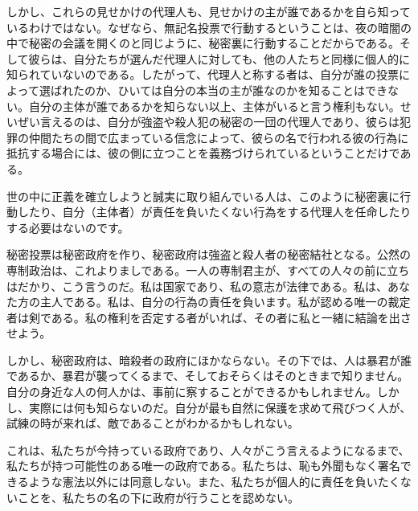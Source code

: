 \documentclass[dvipdfmx, uplatex, tate, landscape]{utbook}
\begin{document}
しかし、これらの見せかけの代理人も、見せかけの主が誰であるかを自ら知っているわけではない。なぜなら、無記名投票で行動するということは、夜の暗闇の中で秘密の会議を開くのと同じように、秘密裏に行動することだからである。そして彼らは、自分たちが選んだ代理人に対しても、他の人たちと同様に個人的に知られていないのである。したがって、代理人と称する者は、自分が誰の投票によって選ばれたのか、ひいては自分の本当の主が誰なのかを知ることはできない。自分の主体が誰であるかを知らない以上、主体がいると言う権利もない。せいぜい言えるのは、自分が強盗や殺人犯の秘密の一団の代理人であり、彼らは犯罪の仲間たちの間で広まっている信念によって、彼らの名で行われる彼の行為に抵抗する場合には、彼の側に立つことを義務づけられているということだけである。

世の中に正義を確立しようと誠実に取り組んでいる人は、このように秘密裏に行動したり、自分（主体者）が責任を負いたくない行為をする代理人を任命したりする必要はないのです。

秘密投票は秘密政府を作り、秘密政府は強盗と殺人者の秘密結社となる。公然の専制政治は、これよりましである。一人の専制君主が、すべての人々の前に立ちはだかり、こう言うのだ。私は国家であり、私の意志が法律である。私は、あなた方の主人である。私は、自分の行為の責任を負います。私が認める唯一の裁定者は剣である。私の権利を否定する者がいれば、その者に私と一緒に結論を出させよう。

しかし、秘密政府は、暗殺者の政府にほかならない。その下では、人は暴君が誰であるか、暴君が襲ってくるまで、そしておそらくはそのときまで知りません。自分の身近な人の何人かは、事前に察することができるかもしれません。しかし、実際には何も知らないのだ。自分が最も自然に保護を求めて飛びつく人が、試練の時が来れば、敵であることがわかるかもしれない。

これは、私たちが今持っている政府であり、人々がこう言えるようになるまで、私たちが持つ可能性のある唯一の政府である。私たちは、恥も外聞もなく署名できるような憲法以外には同意しない。また、私たちが個人的に責任を負いたくないことを、私たちの名の下に政府が行うことを認めない。

\chapter{}
\end{document}
